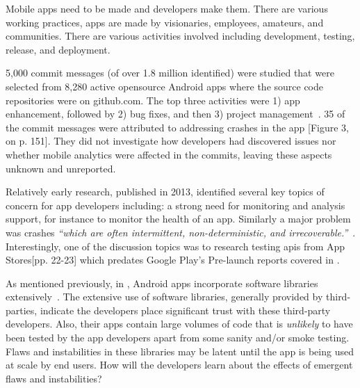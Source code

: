 
Mobile apps need to be made and developers make them. There are various working practices, apps are made by visionaries, employees, amateurs, and communities. There are various activities involved including development, testing, release, and deployment. %


5,000 commit messages (of over 1.8 million identified) were studied that were selected from 8,280 active opensource Android apps where the source code repositories were on github.com. The top three activities were 1) app enhancement, followed by 2) bug fixes, and then 3) project management~. 35 of the commit messages were attributed to addressing crashes in the app [Figure 3, on p. 151]. They did not investigate how developers had discovered issues nor whether mobile analytics were affected in the commits, leaving these aspects unknown and unreported.

Relatively early research, published in 2013, identified several key topics of concern for app developers including: a strong need for monitoring and analysis support, for instance to monitor the health of an app. Similarly a major problem was crashes \emph{``which are often intermittent, non-deterministic, and irrecoverable.''}~. Interestingly, one of the discussion topics was to research testing \acrshort{api}s from App Stores[pp. 22-23] which predates Google Play's Pre-launch reports covered in .


As mentioned previously, in , Android apps incorporate software libraries extensively~. The extensive use of software libraries, generally provided by third-parties, indicate the developers place significant trust with these third-party developers. Also, their apps contain large volumes of code that is \emph{unlikely} to have been tested by the app developers apart from some sanity and/or smoke testing. Flaws and instabilities in these libraries may be latent until the app is being used at scale by end users. How will the developers learn about the effects of emergent flaws and instabilities?

